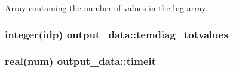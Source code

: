 Array containing the number of values in the big array. 

\subsubsection[{\texorpdfstring{temdiag\+\_\+totvalues}{temdiag_totvalues}}]{\setlength{\rightskip}{0pt plus 5cm}integer(idp) output\+\_\+data\+::temdiag\+\_\+totvalues}\hypertarget{namespaceoutput__data_a85fe1c4047057dc4292320e82cae2cda}{}\label{namespaceoutput__data_a85fe1c4047057dc4292320e82cae2cda}
\subsubsection[{\texorpdfstring{timeit}{timeit}}]{\setlength{\rightskip}{0pt plus 5cm}real(num) output\+\_\+data\+::timeit}\hypertarget{namespaceoutput__data_adee8dc0fd9ff0328c325cfc24be39db3}{}\label{namespaceoutput__data_adee8dc0fd9ff0328c325cfc24be39db3}

